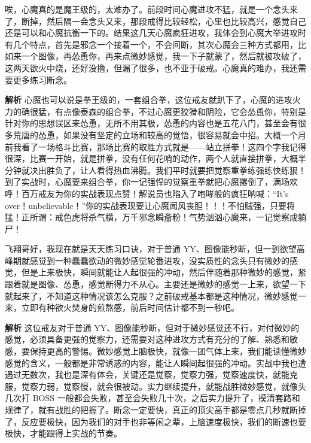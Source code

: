 \begin{case}[如何战胜微妙的感觉]
    唉，心魔真的是魔王级的，太难办了。前段时间心魔进攻不猛，就是一个念头来了，断掉，然后隔一会念头又来，那段戒得比较轻松，心里也比较高兴，感觉自己还是可以和心魔抗衡一下的。结果这几天心魔疯狂进攻，我体会到心魔大举进攻时有几个特点，首先是邪念一个接着一个，不会间断，其次心魔会三种方式都用，比如来一个图像，再怂恿你，再来点微妙感觉，我一下子就蒙了，然后就被攻破了，这两天欲火中烧，还好没撸，但漏了很多，也不亚于破戒。心魔真的难办，我还需要更多练习断念。

    \textbf{解析} 心魔也可以说是拳王级的，一套组合拳，这位戒友就趴下了，心魔的进攻火力的确很猛，有点像泰森的组合拳，不过心魔更狡猾和阴险，它会怂恿你，特别是针对你的思想误区来怂恿，无所不用其极，怂恿的内容也是五花八门，甚至会有很多荒唐的怂恿，如果没有坚定的立场和较高的觉悟，很容易就会中招。大概一个月前我看了一场格斗比赛，那场比赛的取胜方式就是——站立拼拳！这四个字我记得很深，比赛一开始，就是拼拳，没有任何花哨的动作，两个人就直接拼拳，大概半分钟就决出胜负了，让人看得热血沸腾。我们平时就要把觉察重拳练强练快练狠！到了实战时，心魔要来组合拳，你一记强悍的觉察重拳就把心魔撂倒了，满场欢呼！百万戒友为你的实战表现点赞！解说员也陷入了咆哮般的疯狂呐喊：“It's over！unbelievable！”你的实战表现要让心魔闻风丧胆！！！不怕贼强，只要将猛！正所谓：戒色虎将杀气横，万千邪念瞬齑粉！气势汹汹心魔来，一记觉察成躺尸！
\end{case}

\begin{case}[如何战胜微妙的感觉]
    飞翔哥好，我现在就是天天练习口诀，对于普通 YY、图像能秒断，但一到欲望高峰期就感觉到一种蠢蠢欲动的微妙感觉轮番进攻，没实质性的念头只有微妙的感觉，但是上来极快，瞬间就能让人起很强的冲动，然后伴随着那种微妙的感觉，紧跟着就是图像、怂恿，感觉断得力不从心。主要还是微妙的感觉一上来，欲望一下就起来了，不知道这种情况该怎么克服？之前破戒基本都是这种情况，微妙感觉一来，立即有种欲火焚身的煎熬感，前后时间估计都不到一秒吧。

    \textbf{解析} 这位戒友对于普通 YY、图像能秒断，但对于微妙感觉还不行，对付微妙的感觉，必须具备更强的觉察力，还需要对这种进攻方式有充分的了解、熟悉和敏感，要保持更高的警惕。微妙感觉上脑极快，就像一团气体上来，我们能读懂微妙感觉的含义，一般都是非常诱惑的内容，能让人瞬间起很强的冲动。实战中我也遭遇过无数次，我也是深有体会，关键还是觉察，觉察力强，觉察速度快，就能克服，觉察力弱，觉察慢，就会很被动。实力继续提升，就能战胜微妙感觉，就像头几次打 BOSS 一般都会失败，甚至会失败几十次，之后实力提升了，摸清套路和规律了，就有战胜的把握了。断念一定要快，真正的顶尖高手都是零点几秒就断掉了，反应要极快，因为我们的对手也非等闲之辈，上脑速度极快，我们的断速也要极快，才能跟得上实战的节奏。
\end{case}

